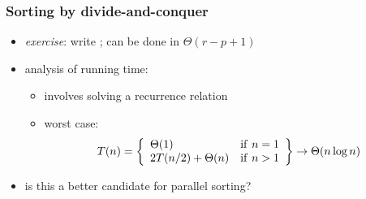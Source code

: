 \begin{frame}[fragile]
%
  \frametitle{Sorting by divide-and-conquer}
%
    \begin{center}
      \begin{minipage}{.75\linewidth}
        \begin{algorithm}[H]
          \label{alg:merge-sort}
%
          \dontprintsemicolon
          \setalcaphskip{0ex}
%
          \caption{\mergesort($S$, $p$, $r$)}
          \vspace{.5em}
%
%
          \vspace{.5em}
%
        \end{algorithm}
      \end{minipage}
    \end{center}
%
  \begin{itemize}
%
  \item {\em exercise}: write \merge; can be done in $\Theta(r-p+1)$
%
  \item analysis of running time:
    \begin{itemize}
    \item involves solving a recurrence relation
    \item worst case:
      \[
      T(n) = \left\{
      \begin{array}{ll}
        \Theta(1)         & {\rm if\ } n = 1 \\
        2T(n/2)+\Theta(n) & {\rm if\ } n > 1
      \end{array} \right\}
      \rightarrow \Theta(n \log n)
      \]
    \end{itemize}
%
  \item is this a better candidate for parallel sorting?
%
  \end{itemize}
%
\end{frame}


